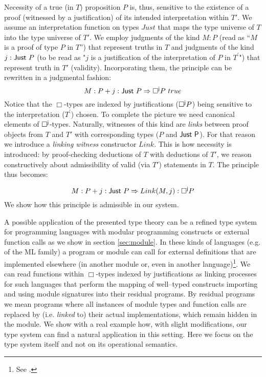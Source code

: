 Necessity of a true (in $T$) proposition $P$ is, thus, sensitive to the existence of a proof (witnessed by a justification) of its intended interpretation within $T'$. We assume an interpretation function on types $Just$ that maps the type universe of $T$ into the type universe of $T'$.  We employ judgments of the kind $M:P$ (read as ``$M$ is a proof of type $P$ in $T$'') that represent truths in $T$ and  judgments of the kind $j:{\sf Just}\  P$ (to be read as "$j$ is a justification of the interpretation of $P$ in $T^\prime$") that represent truth in $T'$ (validity). Incorporating them, the principle can be rewritten in a judgmental fashion: $$M:P + j: {\sf Just}\  P \Rightarrow {\sf \Box^{j}}P\ true$$ Notice that the $\Box$-types are indexed by justifications (${\sf\Box^{j}}P$) being sensitive to the interpretation ($T^{\prime}$) chosen.   
To complete the picture we need canonical elements of ${\sf \Box^{j}}$-types. Naturally, witnesses of this kind are \textit{links} between proof objects from $T$ and $T'$ with corresponding types ($P$ and ${\sf Just \ P}$). For that reason we  introduce a \textit{linking witness} constructor {\sf $Link$}. This is how necessity is introduced: by proof-checking deductions of $T$ with deductions of $T'$,  we reason constructively about admissibility of valid (via $T'$) statements in $T$.
The principle thus becomes: 

$$M:P + j: {\sf Just}\   P \Rightarrow Link(M,j):{\sf \Box^{j}}P$$
We show how this principle is admissible in our system.

A possible application of the presented type theory can be a refined type system for programming languages with modular programming constructs or external function calls as we show in section \ref{sec:module}. In these kinds of languages (e.g. of the {\sf ML} family) a program or module can call for external definitions that are implemented elsewhere (in another module or, even in another language)\footnote{See \cite{Harper98programmingin}.}. We can read functions within $\Box$-types indexed by justifications as  linking  processes for such languages that perform  the mapping of well--typed constructs importing and using module signatures into their residual programs. By residual programs we mean programs where all instances of module types and  function calls are replaced by (i.e. \textit{linked} to) their actual implementations, which remain hidden in the module. We show with a real example how, with slight modifications, our type system can find a natural application in this setting. Here we focus on the type system itself and not on its operational semantics. 


